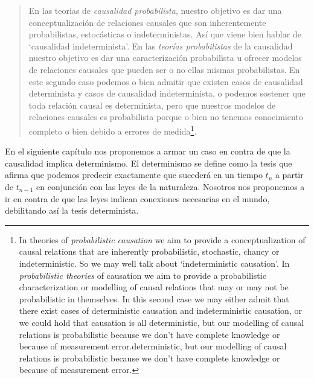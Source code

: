 \begin{quote}
  En las teorias de \textit{causalidad probabilista}, nuestro objetivo es dar una conceptualización de relaciones causales que son inherentemente probabilistas, estocásticas o indeterministas. Así que viene bien hablar de `causalidad indeterminista'. En las \textit{teorías probabilistas} de la causalidad nuestro objetivo es dar una caracterización probabilista u ofrecer modelos de relaciones causales que pueden ser o no ellas mismas probabilistas. En este segundo caso podemos o bien admitir que existen casos de causalidad determinista y casos de causalidad indeterminista, o podemos sostener que toda relación causal es determinista, pero que nuestros modelos de relaciones causales es probabilista porque o bien no tenemos conocimiento completo o bien debido a errores de medida\footnote{In theories of \emph{probabilistic causation} we aim to provide a conceptualization of causal relations that are inherently probabilistic, stochastic, chancy or indeterministic. So we may well talk about ‘indeterministic causation’. In \emph{probabilistic theories} of causation we aim to provide a probabilistic characterization or modelling of causal relations that may or may not be probabilistic in themselves. In this second case we may either admit that there exist cases of deterministic causation and indeterministic causation, or we could hold that causation is all deterministic, but our modelling of causal relations is probabilistic because we don’t have complete knowledge or because of measurement error.deterministic, but our modelling of causal relations is probabilistic because we don’t have complete knowledge or because of measurement error.}. \cite[p. 82-83]{Illari2014}
\end{quote}

En el siguiente capítulo nos proponemos a armar un caso en contra de que la causalidad implica determinismo. El determinismo se define como la tesis que afirma que podemos predecir exactamente que sucederá en un tiempo $t_{n}$ a partir de $t_{n-1}$ en conjunción con las leyes de la naturaleza. Nosotros nos proponemos a ir en contra de que las leyes indican conexiones necesarias en el mundo, debilitando así la tesis determinista.

